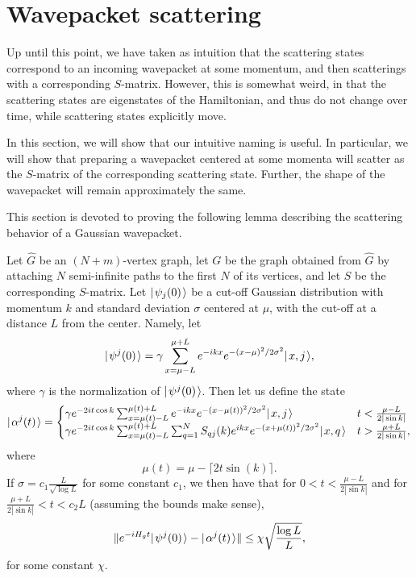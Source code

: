 \documentclass[../thesis-main/thesis-main]{subfiles}
\begin{document}
\section{Wavepacket scattering}

Up until this point, we have taken as intuition that the scattering states correspond to an incoming wavepacket at some momentum, and then scatterings with a corresponding $S$-matrix.  However, this is somewhat weird, in that the scattering states are eigenstates of the Hamiltonian, and thus do not change over time, while scattering states explicitly move.  

In this section, we will show that our intuitive naming is useful.  In particular, we will show that preparing a wavepacket centered at some momenta will scatter as the $S$-matrix of the corresponding scattering state.  Further, the shape of the wavepacket will remain approximately the same.

This section is devoted to proving the following lemma describing the scattering behavior of a Gaussian wavepacket.

\begin{theorem}
  Let $\widehat{G}$ be an $(N+m)$-vertex graph, let $G$ be the graph obtained from $\widehat{G}$ by attaching $N$ semi-infinite paths to the first $N$ of its vertices, and let $S$ be the corresponding $S$-matrix.  Let $|\mspace{2mu} \psi_j(0) \mspace{2mu} \rangle$ be a cut-off Gaussian distribution with momentum $k$ and standard deviation $\sigma$ centered at $\mu$, with the cut-off at a distance $L$ from the center.  Namely, let 
  \begin{equation}
    |\mspace{2mu} \psi^j(0) \mspace{2mu} \rangle = \gamma \sum_{x = \mu - L}^{\mu + L} e^{- i k x} e^{- (x - \mu)^2/2\sigma^2} |\mspace{2mu} x,j \mspace{2mu} \rangle  \label{eq:guass_start_defn},
  \end{equation}
  where $\gamma$ is the normalization of $|\mspace{2mu} \psi^j(0) \mspace{2mu} \rangle$.  Then let us define the state 
  \begin{equation}
    |\mspace{2mu} \alpha^j(t) \mspace{2mu} \rangle =\begin{cases}  \gamma e^{-2 i t \cos k} \sum_{x = \mu(t) -L}^{\mu(t)+L} e^{-i k x} e^{ -(x - \mu(t))^2/2\sigma^2} 
    			 |\mspace{2mu} x,j \mspace{2mu} \rangle & t < \frac{\mu-L}{2|\sin k|}\\
			 \gamma e^{-2 i t \cos k} \sum_{x = \mu(t)-L}^{\mu(t) + L} \sum_{q=1}^N  S_{qj}(k) e^{i k x} e^{-(x + \mu(t))^2/2\sigma^2} |\mspace{2mu} x,q \mspace{2mu} \rangle & t > \frac{\mu+L}{2|\sin k|},\end{cases}\label{eq:guass_approximation_defn}
  \end{equation}
  where
  \begin{equation}
    \mu(t) = \mu - \lceil 2 t \sin(k)\rceil.
  \end{equation}
  If $\sigma = c_1 \frac{ L}{\sqrt{\log L}}$ for some constant $c_1$, we then have that for $0 < t < \frac{\mu - L}{2|\sin k|}$ and for $\frac{\mu + L}{2|\sin k|} < t < c_2 L$ (assuming the bounds make sense),  
  \begin{equation}
    \|{e^{-i H_g t} |\mspace{2mu} \psi^j(0) \mspace{2mu} \rangle - |\mspace{2mu} \alpha^j (t) \mspace{2mu} \rangle}\| \leq \chi \sqrt{\frac{\log L}{L}},
  \end{equation}  
  for some constant $\chi$.
\label{thm:single_particle_wavepacket_bound}
\end{theorem}
\end{document}
